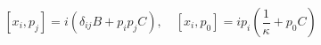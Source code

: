 \begin{equation}\label{a.7}
 [x_{i},p_{j}]=i(\delta_{ij}B+p_{i}p_{j}C), \quad [x_{i},p_{0}]=ip_{i}(\frac{1}{\kappa}+p_{0}C)
\end{equation}

